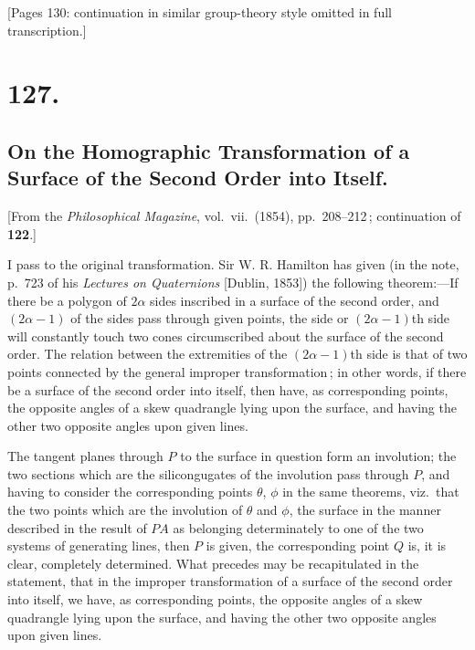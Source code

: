 \documentclass[11pt,a4paper]{article}
\theoremstyle{definition}
\begin{document}
\bigskip

[Pages 130: continuation in similar group-theory style omitted in full transcription.]

\medskip

\section*{127.}
\subsection*{On the Homographic Transformation of a Surface of the Second Order into Itself.}

[From the \textit{Philosophical Magazine}, vol.\ vii.\ (1854), pp.\ 208--212\,; continuation of \textbf{122}.]

\medskip

I pass to the original transformation. Sir W. R. Hamilton has given (in the note,
p.\ 723 of his \textit{Lectures on Quaternions} [Dublin, 1853]) the following theorem:---If there
be a polygon of $2\alpha$ sides inscribed in a surface of the second order, and $(2\alpha-1)$ of
the sides pass through given points, the side or $(2\alpha-1)$th side will constantly touch two
cones circumscribed about the surface of the second order. The relation between the
extremities of the $(2\alpha-1)$th side is that of two points connected by the general improper
transformation\,; in other words, if there be a surface of the second order into itself, then
have, as corresponding points, the opposite angles of a skew quadrangle lying upon
the surface, and having the other two opposite angles upon given lines.

\medskip

The tangent planes through $P$ to the surface in question form an involution; the
two sections which are the silicongugates of the involution pass through $P$, and
having to consider the corresponding points $\theta$, $\phi$ in the same theorems, viz.\ that the
two points which are the involution of $\theta$ and $\phi$, the surface in the manner
described in the result of $PA$ as belonging determinately to one of the two
systems of generating lines, then $P$ is given, the corresponding point $Q$ is, it
is clear, completely determined. What precedes may be recapitulated in the statement,
that in the improper transformation of a surface of the second order into itself, we
have, as corresponding points, the opposite angles of a skew quadrangle lying upon
the surface, and having the other two opposite angles upon given lines.
\end{document}
